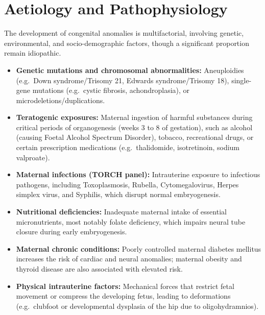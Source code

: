 \section*{Aetiology and Pathophysiology}
The development of congenital anomalies is multifactorial, involving genetic, environmental, and socio-demographic factors, though a significant proportion remain idiopathic.
\begin{itemize}
    \item \textbf{Genetic mutations and chromosomal abnormalities:} Aneuploidies (e.g.\ Down syndrome/Trisomy 21, Edwards syndrome/Trisomy 18), single-gene mutations (e.g.\ cystic fibrosis, achondroplasia), or microdeletions/duplications.
    \item \textbf{Teratogenic exposures:} Maternal ingestion of harmful substances during critical periods of organogenesis (weeks 3 to 8 of gestation), such as alcohol (causing Foetal Alcohol Spectrum Disorder), tobacco, recreational drugs, or certain prescription medications (e.g.\ thalidomide, isotretinoin, sodium valproate).
    \item \textbf{Maternal infections (TORCH panel):} Intrauterine exposure to infectious pathogens, including Toxoplasmosis, Rubella, Cytomegalovirus, Herpes simplex virus, and Syphilis, which disrupt normal embryogenesis.
    \item \textbf{Nutritional deficiencies:} Inadequate maternal intake of essential micronutrients, most notably folate deficiency, which impairs neural tube closure during early embryogenesis.
    \item \textbf{Maternal chronic conditions:} Poorly controlled maternal diabetes mellitus increases the risk of cardiac and neural anomalies; maternal obesity and thyroid disease are also associated with elevated risk.
    \item \textbf{Physical intrauterine factors:} Mechanical forces that restrict fetal movement or compress the developing fetus, leading to deformations (e.g.\ clubfoot or developmental dysplasia of the hip due to oligohydramnios).
\end{itemize}

